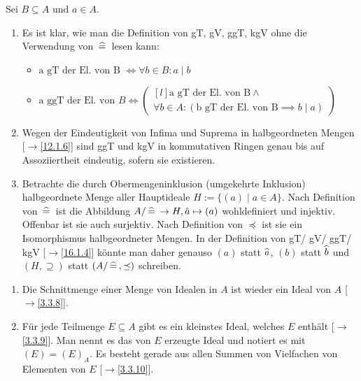 \documentclass[../../main.tex]{subfiles}
\begin{document}
\begin{bem}\label{16.1.16}
Sei $B\subseteq A$ und $a\in A$.
\begin{enumerate}[\normalfont(a)]
\item Es ist klar, wie man die Definition von gT, gV, ggT, kgV ohne die Verwendung von $\,\widehat{=}\,$ lesen kann:
\begin{itemize}
\item $\text{a gT der El. von B }\Longleftrightarrow \forall b\in B: a\mid b$
\item $\text{a ggT der El. von }B \Longleftrightarrow\begin{pmatrix*}[l]\text{a gT der El. von B}\land\\ \forall b\in A: (\text{b gT der El. von B}\implies b\mid a)\end{pmatrix*}$

\end{itemize}
\item Wegen der Eindeutigkeit von Infima und Suprema in halbgeordneten Mengen [$\to$\ref{12.1.6}] sind ggT und kgV in kommutativen Ringen genau bis auf Assoziiertheit eindeutig, sofern sie existieren.
\item Betrachte die durch Obermengeninklusion (umgekehrte Inklusion) halbgeordnete Menge aller Hauptideale $H:=\{(a)\mid a\in A\}$. Nach Definition von $\,\widehat{=}\,$ ist die Abbildung $A/\,\widehat{=}\,\to H, \hat{a}\mapsto (a)$ wohldefiniert und injektiv. Offenbar ist sie auch surjektiv. Nach Definition von $\preceq$ ist sie ein Isomorphismus halbgeordneter Mengen. In der Definition von gT/ gV/ ggT/ kgV [$\to$\ref{16.1.4}] könnte man daher genauso $(a)$ statt $\widehat{a}$, $(b)$ statt $\widehat{b}$ und $(H,\supseteq)$ statt $(A/\,\widehat{=}\,,\preceq)$ schreiben.
\end{enumerate}
\end{bem}

\begin{er}\label{16.1.17}
\begin{enumerate}[\normalfont(a)]
\item Die Schnittmenge einer Menge von Idealen in $A$ ist wieder ein Ideal von $A$ [$\to$\ref{3.3.8}].
\item Für jede Teilmenge $E\subseteq A$ gibt es ein kleinstes Ideal, welches $E$ enthält [$\to$\ref{3.3.9}]. Man nennt es das von $E$ erzeugte Ideal und notiert es mit $(E)=(E)_A$. Es besteht gerade aus allen Summen von Vielfachen von Elementen von $E$ [$\to$\ref{3.3.10}].
\end{enumerate}
\end{er}
\end{document}
